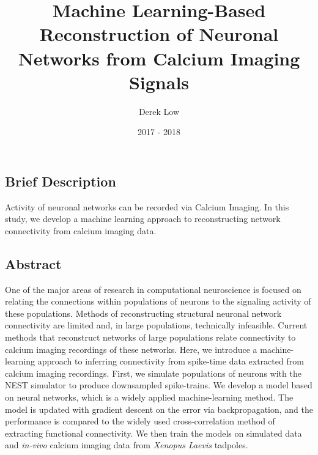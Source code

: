 \documentclass[11pt,titlepage]{article}
\title{Machine Learning-Based Reconstruction of Neuronal Networks from Calcium Imaging Signals}
\author{Derek Low}
\date{2017 - 2018}
\begin{document}

\clearpage
\subsection{Brief Description}
Activity of neuronal networks can be recorded via Calcium Imaging. In this study, we develop a machine learning approach to reconstructing network connectivity from calcium imaging data.

\subsection{Abstract}
One of the major areas of research in computational neuroscience is focused on relating the connections within populations of neurons to the signaling activity of these populations. Methods of reconstructing structural neuronal network connectivity are limited and, in large populations, technically infeasible. Current methods that reconstruct networks of large populations relate connectivity to calcium imaging recordings of these networks. Here, we introduce a machine-learning approach to inferring connectivity from spike-time data extracted from calcium imaging recordings. First, we simulate populations of neurons with the NEST simulator to produce downsampled spike-trains. We develop a model based on neural networks, which is a widely applied machine-learning method. The model is updated with gradient descent on the error via backpropagation, and the performance is compared to the widely used cross-correlation method of extracting functional connectivity. We then train the models on simulated data and \textit{in-vivo} calcium imaging data from \textit{Xenopus Laevis} tadpoles.

\clearpage
\end{document}
